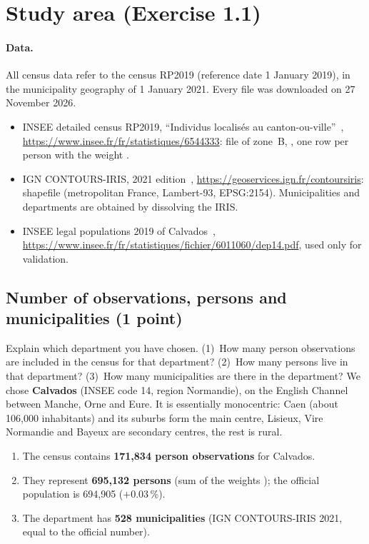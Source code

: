 \section{Study area (Exercise 1.1)}\label{sec:study-area}

\paragraph{Data.}
All census data refer to the census RP2019 (reference date 1 January 2019), in the municipality geography of
1 January 2021. Every file was downloaded on 27 November 2026.
\begin{itemize}
  \item INSEE detailed census RP2019, ``Individus localis\'es au canton-ou-ville''~\cite{insee-census-detailed},
  \url{https://www.insee.fr/fr/statistiques/6544333}: file of zone~B, , one row per
  person with the weight .
  \item IGN CONTOURS-IRIS, 2021 edition~\cite{ign-contours-iris}, \url{https://geoservices.ign.fr/contoursiris}:
  shapefile  (metropolitan France, Lambert-93, EPSG:2154).
  Municipalities and departments are obtained by dissolving the IRIS.
  \item INSEE legal populations 2019 of Calvados~\cite{insee-popleg-2019},
  \url{https://www.insee.fr/fr/statistiques/fichier/6011060/dep14.pdf}, used only for validation.
\end{itemize}

\subsection{Number of observations, persons and municipalities (1 point)}

\begin{qa}{Explain which department you have chosen. (1)~How many person observations are included in the census for
that department? (2)~How many persons live in that department? (3)~How many municipalities are there in the
department?}
We chose \textbf{Calvados} (INSEE code 14, region Normandie), on the English Channel between Manche, Orne and Eure.
It is essentially monocentric: Caen (about 106{,}000 inhabitants) and its suburbs form the main centre, Lisieux,
Vire Normandie and Bayeux are secondary centres, the rest is rural.
\begin{enumerate}
  \item The census contains \textbf{171{,}834 person observations} for Calvados.
  \item They represent \textbf{695{,}132 persons} (sum of the weights ); the official population is
  694{,}905 ($+0.03\,\%$).
  \item The department has \textbf{528 municipalities} (IGN CONTOURS-IRIS 2021, equal to the official number).
\end{enumerate}
\end{qa}

